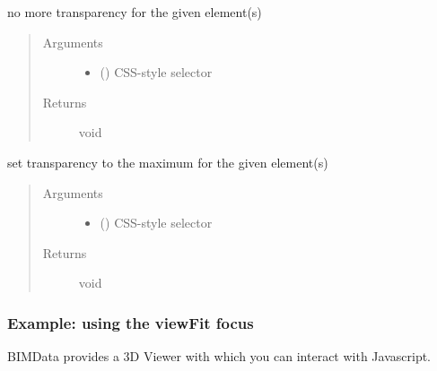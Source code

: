 \documentclass[a4paper,12pt,english]{sphinxmanual}
\begin{document}
\begin{fulllineitems}
\label{\detokenize{viewer/parameters:BIMDataViewer.unghost}}
no more transparency for the given element(s)
\begin{quote}\begin{description}
\item[{Arguments}] \leavevmode\begin{itemize}
\item {} 
 () \textendash{} CSS-style selector

\end{itemize}

\item[{Returns}] \leavevmode
void

\end{description}\end{quote}

\end{fulllineitems}



\begin{fulllineitems}
\label{\detokenize{viewer/parameters:BIMDataViewer.ghost}}
set transparency to the maximum for the given element(s)
\begin{quote}\begin{description}
\item[{Arguments}] \leavevmode\begin{itemize}
\item {} 
 () \textendash{} CSS-style selector

\end{itemize}

\item[{Returns}] \leavevmode
void

\end{description}\end{quote}

\end{fulllineitems}



\subsubsection{Example: using the viewFit focus}
\label{\detokenize{viewer/viewfit_focus:example-using-the-viewfit-focus}}\label{\detokenize{viewer/viewfit_focus::doc}}
BIMData provides a 3D Viewer with which you can interact with Javascript.
\end{document}
